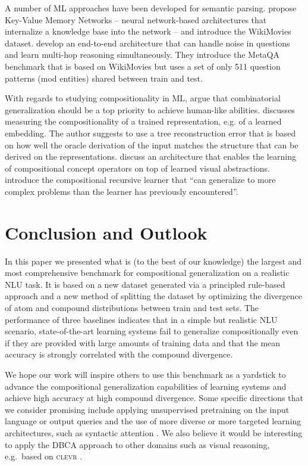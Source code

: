 \documentclass[letterpaper]{article}
\begin{document}
A number of ML approaches have been developed for semantic parsing. 
\citet{KVMN-wikimovies} propose Key-Value Memory Networks -- neural network-based architectures that internalize a knowledge base into the network -- and introduce the WikiMovies dataset. \citet{zhang2018variational} develop an end-to-end architecture that can handle noise in questions and learn multi-hop reasoning simultaneously. They introduce the MetaQA benchmark that is based on WikiMovies but uses a set of only 511 question patterns (mod entities) shared between train and test.

With regards to studying compositionality in ML, \citet{battaglia2018relational} argue that combinatorial generalization should be a top priority to achieve human-like abilities. 
\citet{andreas2019measuring} discusses measuring the compositionality of a trained representation, e.g. of a learned embedding. The author suggests to use a tree reconstruction error that is based on how well the oracle derivation of the input matches the structure that can be derived on the representations.
\citet{higgins2017scan} discuss an architecture that enables the learning of compositional concept operators on top of learned visual abstractions.
\citet{chang2018automatically} introduce the compositional recursive learner that ``can generalize
to more complex problems than the learner has previously encountered''.

\section{Conclusion and Outlook}
\label{sect:conc}

In this paper we presented what is (to the best of our knowledge) the largest and most comprehensive benchmark for compositional generalization on a realistic NLU task. It is based on a new dataset generated via a principled rule-based approach and a new method of splitting the dataset by optimizing the divergence of atom and compound distributions between train and test sets.
The performance of three baselines indicates that in a simple but realistic NLU scenario, state-of-the-art learning systems fail to generalize compositionally even if they are provided with large amounts of training data and that the mean accuracy is strongly correlated with the compound divergence.

We hope our work will inspire others to use this benchmark as a yardstick to advance the compositional generalization capabilities of learning systems and achieve high accuracy at high compound divergence. Some specific directions that we consider promising include applying unsupervised pretraining on the input language or output queries and the use of more diverse or more targeted learning architectures, such as syntactic attention \citep{YBcomp2019}.
We also believe it would be interesting to apply the DBCA approach to other domains such as visual reasoning, e.g.\ based on \textsc{clevr} \citep{CLEVR}.
\end{document}
